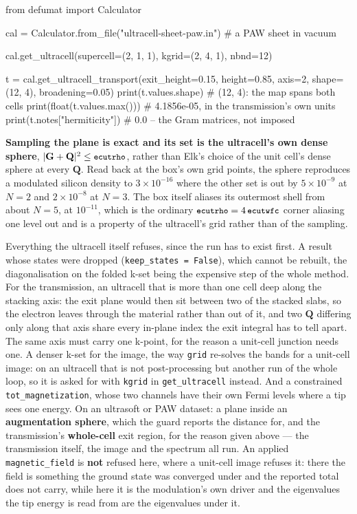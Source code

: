 \documentclass[11pt,a4paper]{article}
\newcommand{\code}[1]{\texttt{\small #1}}
\begin{document}
\begin{pycode}
from defumat import Calculator

cal = Calculator.from_file("ultracell-sheet-paw.in")   # a PAW sheet in vacuum

cal.get_ultracell(supercell=(2, 1, 1), kgrid=(2, 4, 1), nbnd=12)

t = cal.get_ultracell_transport(exit_height=0.15, height=0.85, axis=2,
                                shape=(12, 4), broadening=0.05)
print(t.values.shape)            # (12, 4): the map spans both cells
print(float(t.values.max()))     # 4.1856e-05, in the transmission's own units
print(t.notes["hermiticity"])    # 0.0 -- the Gram matrices, not imposed
\end{pycode}

\textbf{Sampling the plane is exact and its set is the ultracell's own dense
sphere}, $|\mathbf G + \mathbf Q|^2 \le \code{ecutrho}$, rather than Elk's
choice of the unit cell's dense sphere at every $\mathbf Q$. Read back at the
box's own grid points, the sphere reproduces a modulated silicon density to
$3\times10^{-16}$ where the other set is out by $5\times10^{-9}$ at $N = 2$ and
$2\times10^{-8}$ at $N = 3$. The box itself aliases its outermost shell from
about $N = 5$, at $10^{-11}$, which is the ordinary $\code{ecutrho} = 4\,
\code{ecutwfc}$ corner aliasing one level out and is a property of the
ultracell's grid rather than of the sampling.

\begin{refuses}
Everything the ultracell itself refuses, since the run has to exist first. A
result whose states were dropped (\code{keep\_states = False}), which cannot be
rebuilt, the diagonalisation on the folded k-set being the expensive step of the
whole method. For the transmission, an ultracell that is more than one cell deep
along the stacking axis: the exit plane would then sit between two of the
stacked slabs, so the electron leaves through the material rather than out of
it, and two $\mathbf Q$ differing only along that axis share every in-plane
index the exit integral has to tell apart. The same axis must carry one k-point,
for the reason a unit-cell junction needs one. A denser k-set for the image, the
way \code{grid} re-solves the bands for a unit-cell image: on an ultracell that
is not post-processing but another run of the whole loop, so it is asked for
with \code{kgrid} in \code{get\_ultracell} instead. And a constrained
\code{tot\_magnetization}, whose two channels have their own Fermi levels where
a tip sees one energy. On an ultrasoft or PAW dataset: a plane inside an
\textbf{augmentation sphere}, which the guard reports the distance for, and the
transmission's \textbf{whole-cell} exit region, for the reason given above ---
the transmission itself, the image and the spectrum all run. An applied \code{magnetic\_field} is \textbf{not} refused
here, where a unit-cell image refuses it: there the field is something the
ground state was converged under and the reported total does not carry, while
here it is the modulation's own driver and the eigenvalues the tip energy is
read from are the eigenvalues under it.
\end{refuses}
\end{document}
